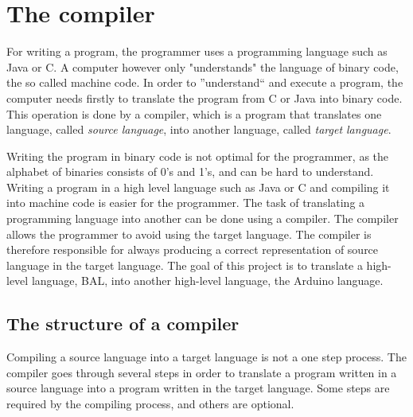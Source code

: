 \chapter{The compiler} \label{chap:the_compiler}
For writing a program, the programmer uses a programming language such as Java or C. A computer however only "understands" the language of binary code, the so called machine code. In order to ''understand`` and execute a program, the computer needs firstly to translate the program from C or Java into binary code. This operation is done by a compiler, which is a program that translates one language, called \textit{source language}, into another language, called \textit{target language}. 

Writing the program in binary code is not optimal for the programmer, as the alphabet of binaries consists of 0's and 1's, and can be hard to understand. Writing a program in a high level language such as Java or C and compiling it into machine code is easier for the programmer. The task of translating a programming language into another can be done using a compiler. The compiler allows the programmer to avoid using the target language. The compiler is therefore responsible for always producing a correct representation of source language in the target language. The goal of this project is to translate a high-level language, BAL, into another high-level language, the Arduino language.

\section{The structure of a compiler} 
\label{sec:compiler}
Compiling a source language into a target language is not a one step process. The compiler goes through several steps in order to translate a program written in a source language into a program written in the target language. Some steps are required by the compiling process, and others are optional.

